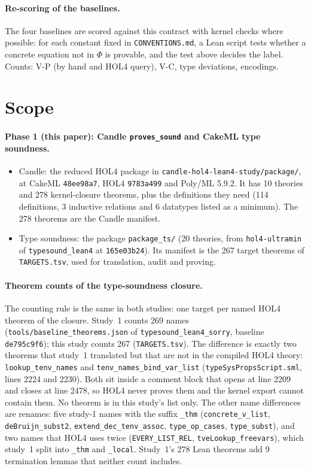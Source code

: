 \documentclass[11pt,a4paper]{article}
\newcommand{\code}[1]{\texttt{#1}}
\begin{document}
\paragraph{Re-scoring of the baselines.}\label{sec:rescore} The four baselines are scored against this contract with kernel checks where possible: for each constant fixed in \code{CONVENTIONS.md}, a Lean script tests whether a concrete equation not in $\Phi$ is provable, and the test above decides the label. Counts: V-P (by hand and HOL4 query), V-C, type deviations, encodings.

\section{Scope}\label{sec:scope}
\paragraph{Phase 1 (this paper): Candle \code{proves\_sound} and CakeML type soundness.}
\begin{itemize}
\item Candle: the reduced HOL4 package in \code{candle-hol4-lean4-study/package/}, at CakeML \code{48ee98a7}, HOL4 \code{9783a499} and Poly/ML 5.9.2. It has 10 theories and 278 kernel-closure theorems, plus the definitions they need (114 definitions, 3 inductive relations and 6 datatypes listed as a minimum). The 278 theorems are the Candle manifest.
\item Type soundness: the package \code{package\_ts/} (20 theories, from \code{hol4-ultramin} of \code{typesound\_lean4} at \code{165e03b24}). Its manifest is the 267 target theorems of \code{TARGETS.tsv}, used for translation, audit and proving.
\end{itemize}
\paragraph{Theorem counts of the type-soundness closure.}\label{sec:counts}
The counting rule is the same in both studies: one target per named HOL4 theorem of the closure. Study~1 counts 269 names (\code{tools/baseline\_theorems.json} of \code{typesound\_lean4\_sorry}, baseline \code{de795c9f6}); this study counts 267 (\code{TARGETS.tsv}). The difference is exactly two theorems that study~1 translated but that are not in the compiled HOL4 theory: \code{lookup\_tenv\_names} and \code{tenv\_names\_bind\_var\_list} (\code{typeSysPropsScript.sml}, lines 2224 and 2230). Both sit inside a comment block that opens at line 2209 and closes at line 2478, so HOL4 never proves them and the kernel export cannot contain them. No theorem is in this study's list only. The other name differences are renames: five study-1 names with the suffix \code{\_thm} (\code{concrete\_v\_list}, \code{deBruijn\_subst2}, \code{extend\_dec\_tenv\_assoc}, \code{type\_op\_cases}, \code{type\_subst}), and two names that HOL4 uses twice (\code{EVERY\_LIST\_REL}, \code{tveLookup\_freevars}), which study~1 split into \code{\_thm} and \code{\_local}. Study~1's 278 Lean theorems add 9 termination lemmas that neither count includes.
\end{document}
